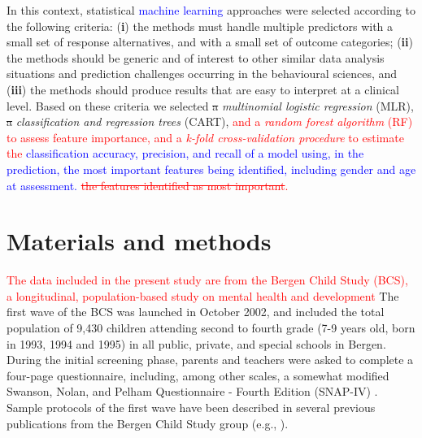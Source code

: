 \documentclass[10pt,letterpaper]{article}
\begin{document}
In this context, statistical \textcolor{blue}{machine learning} approaches were selected according to the following criteria: ({\bf i}) the methods must handle multiple predictors with a small set of response alternatives, and with a small set of outcome categories; ({\bf ii}) the methods should be generic and of interest to other similar data analysis situations  
and prediction challenges  occurring in the behavioural sciences, and ({\bf iii}) the methods should produce results that are easy to interpret at a clinical level. 
Based on these criteria we selected \sout{a} {\em multinomial logistic regression} (MLR), \sout{a} {\em classification and regression trees} (CART), \textcolor{red}{and a {\em random forest algorithm} (RF) to assess feature importance, and a {\em k-fold cross-validation procedure} to estimate the \textcolor{blue}{classification accuracy,  precision, and recall of a model using, in the prediction, the most important features being identified, including gender and age at assessment.} \sout{the features identified as most important}. }

%

\section*{Materials and methods}
\textcolor{red}{The data included in the present study are from the Bergen Child Study (BCS), a longitudinal, population-based study on mental health and development}
The first wave of the BCS was launched in October 2002, and included the total population of 9,430 children attending second to fourth grade (7-9 years old, born in 1993, 1994 and 1995) in all public, private, and special schools in Bergen. 
During the initial screening phase, parents and teachers were asked to complete a four-page questionnaire, including, among other scales, a somewhat modified Swanson, Nolan, and Pelham Questionnaire - Fourth Edition (SNAP-IV) \cite{Swanson1992}.
Sample protocols of the first wave have been described in several previous publications from the Bergen Child Study group 
(e.g., \cite{Heiervang2007, Lundervold2011, Sivertsen2015}).\\
\end{document}
